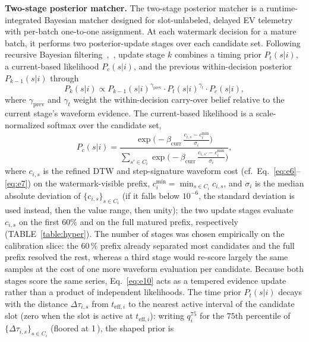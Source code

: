 \documentclass{ieeeaccess}
\newif\ifhighlight \highlightfalse
\DeclareRobustCommand{\revised}[1]{\ifhighlight{\color{blue}#1}\else{\color{.}#1}\fi}
\begin{document}
    \textbf{Two-stage posterior matcher.}
    The two-stage posterior matcher is a runtime-integrated Bayesian matcher designed for \revised{slot-unlabeled}, delayed EV telemetry \revised{with per-batch one-to-one assignment}.
    At each watermark decision for a mature batch, it performs two posterior-update stages over each candidate set.
    Following recursive Bayesian filtering~\cite{b19},~\cite{bsarkka}, update stage $k$ combines a timing prior $P_t(s|i)$, a current-based likelihood $P_c(s|i)$, and the previous within-decision posterior $P_{k-1}(s|i)$ through
    \begin{equation}\label{eq:e10}
        P_k(s|i) \propto P_{k-1}(s|i)^{\gamma_{\text{prev}}} \cdot P_t(s|i)^{\gamma_t} \cdot P_c(s|i),
    \end{equation}
    where $\gamma_{\text{prev}}$ and $\gamma_t$ weight the within-decision carry-over belief relative to the current stage's waveform evidence.
    The current-based likelihood is a scale-normalized softmax over the candidate set,
    \begin{equation}\label{eq:pc}
        P_c(s|i) = \frac{\exp\!\big(-\beta_{\text{curr}}\,\frac{c_{i,s}-c_i^{\min}}{\sigma_i}\big)}{\sum_{s'\in C_i}\exp\!\big(-\beta_{\text{curr}}\,\frac{c_{i,s'}-c_i^{\min}}{\sigma_i}\big)},
    \end{equation}
    where $c_{i,s}$ is the refined DTW and step-signature waveform cost (cf.\ Eq.~\eqref{eq:e6}--\eqref{eq:e7}) on the watermark-visible prefix, $c_i^{\min}=\min_{s\in C_i}c_{i,s}$, and $\sigma_i$ is the median absolute deviation of $\{c_{i,s}\}_{s\in C_i}$ (if it falls below $10^{-6}$, the standard deviation is used instead, then the value range, then unity); the two update stages evaluate $c_{i,s}$ on the first $60\%$ and on the full matured prefix, respectively (TABLE~\ref{table:hyper}).
    \revised{The number of stages was chosen empirically on the calibration slice: the 60\,\% prefix already separated most candidates and the full prefix resolved the rest, whereas a third stage would re-score largely the same samples at the cost of one more waveform evaluation per candidate.
    Because both stages score the same series, Eq.~\eqref{eq:e10} acts as a tempered evidence update rather than a product of independent likelihoods.}
    The time prior $P_t(s|i)$ \revised{decays with the distance $\Delta\tau_{i,s}$ from $t_{\text{eff},i}$ to the nearest active interval of the candidate slot (zero when the slot is active at $t_{\text{eff},i}$)}: writing $q^{75}_i$ for the $75$th percentile of $\{\Delta\tau_{i,s}\}_{s\in C_i}$ (floored at 1\,), the shaped prior is
\end{document}
